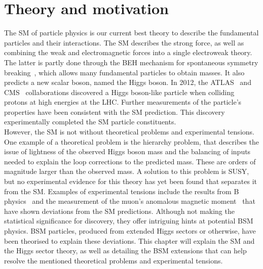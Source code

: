 \chapter{Theory and motivation}
\label{sec:theory}

The \ac{SM} of particle physics is our current best theory to describe the fundamental particles and their interactions.
The \ac{SM} describes the strong force, as well as combining the weak and electromagnetic forces into a single electroweak theory.
The latter is partly done through the \ac{BEH} mechanism for spontaneous symmetry breaking~\cite{Englert:1964et,Higgs:1964ia,Higgs:1964pj,Higgs:1966ev,Guralnik:1964eu,Kibble:1967sv}, which allows many fundamental particles to obtain masses.
It also predicts a new scalar boson, named the Higgs boson.
In 2012, the ATLAS~\cite{ATLAS_Higgs_Discovery} and CMS~\cite{CMS_Higgs_Discovery} collaborations discovered a Higgs boson-like particle when colliding protons at high energies at the \ac{LHC}. 
Further measurements of the particle's properties have been consistent with the \ac{SM} prediction.
This discovery experimentally completed the \ac{SM} particle constituents. \\

However, the \ac{SM} is not without theoretical problems and experimental tensions.
One example of a theoretical problem is the hierarchy problem, that describes the issue of lightness of the observed Higgs boson mass and the  balancing of inputs needed to explain the loop corrections to the predicted mass. 
These are orders of magnitude larger than the observed mass.
A solution to this problem is \ac{SUSY}, but no experimental evidence for this theory has yet been found that separates it from the \ac{SM}. 
Examples of experimental tensions include the results from B physics~\cite{LHCb:2015gmp,LHCb:2017rln,LHCb:2017smo,LHCb:2021trn,Kowalewski:2013mna,BaBar:2013mob,Belle:2015qfa,Belle:2016dyj} and the measurement of the muon's anomalous magnetic moment~\cite{Muong-2:2006rrc,Muong-2:2021ojo} that have shown deviations from the \ac{SM} predictions.
Although not making the statistical significance for discovery, they offer intriguing hints at potential \ac{BSM} physics.
\ac{BSM} particles, produced from extended Higgs sectors or otherwise, have been theorised to explain these deviations.
This chapter will explain the \ac{SM} and the Higgs sector theory, as well as detailing the \ac{BSM} extensions that can help resolve the mentioned theoretical problems and experimental tensions. \\


